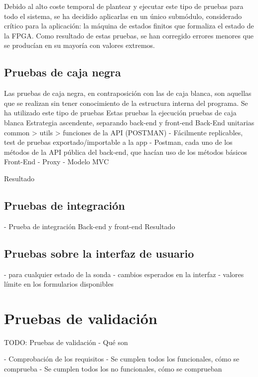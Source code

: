 Debido al alto coste temporal de plantear y ejecutar este tipo de pruebas para todo el sistema, se ha decidido aplicarlas en un único submódulo, considerado crítico para la aplicación: la máquina de estados finitos que formaliza el estado de la \gls{FPGA}.
Como resultado de estas pruebas, se han corregido errores menores que se producían en su mayoría con valores extremos.

\subsection*{Pruebas de caja negra\label{ssec:pb:caja_negra}}

Las pruebas de caja negra, en contraposición con las de caja blanca, son aquellas que se realizan sin tener conocimiento de la estructura interna del programa.
Se ha utilizado este tipo de pruebas
Estas pruebas la ejecución
pruebas de caja blanca
    Estrategia ascendente, separando back-end y front-end
Back-End
unitarias
common > utils > funciones de la API (POSTMAN)
    - Fácilmente replicables, test de pruebas exportado/importable a la app
        - Postman, cada uno de los métodos de la API pública del back-end, que hacían uso de los métodos básicos
Front-End
    - Proxy
    - Modelo MVC

    Resultado


\subsection*{Pruebas de integración\label{ssec:pb:integracion}}
  - Prueba de integración
    Back-end y front-end
    Resultado

\subsection*{Pruebas sobre la interfaz de usuario\label{ssec:pb:interfaz}}

    - para cualquier estado de la sonda
    - cambios esperados en la interfaz
    - valores límite en los formularios disponibles

\section{Pruebas de validación\label{sec:pb:validacion}}

TODO: Pruebas de validación
- Qué son

- Comprobación de los requisitos
  - Se cumplen todos los funcionales, cómo se comprueba
  - Se cumplen todos los no funcionales, cómo se comprueban
